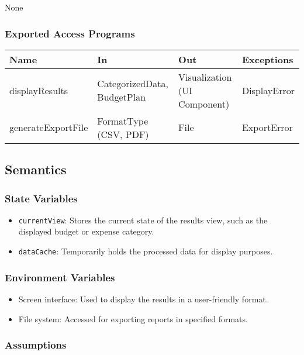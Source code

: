 \documentclass[12pt, titlepage]{article}
\begin{document}
None

\subsubsection{Exported Access Programs}

\begin{center}
\begin{tabular}{p{4cm} p{4cm} p{4cm} p{4cm}}
\hline
\textbf{Name} & \textbf{In} & \textbf{Out} & \textbf{Exceptions} \\
\hline
displayResults & CategorizedData, BudgetPlan & Visualization (UI Component) & DisplayError \\
\hline
generateExportFile & FormatType (CSV, PDF) & File & ExportError \\
\hline
\end{tabular}
\end{center}

\subsection{Semantics}

\subsubsection{State Variables}

\begin{itemize}
    \item \texttt{currentView}: Stores the current state of the results view, such as the displayed budget or expense category.
    \item \texttt{dataCache}: Temporarily holds the processed data for display purposes.
\end{itemize}

\subsubsection{Environment Variables}

\begin{itemize}
    \item Screen interface: Used to display the results in a user-friendly format.
    \item File system: Accessed for exporting reports in specified formats.
\end{itemize}

\subsubsection{Assumptions}
\end{document}
